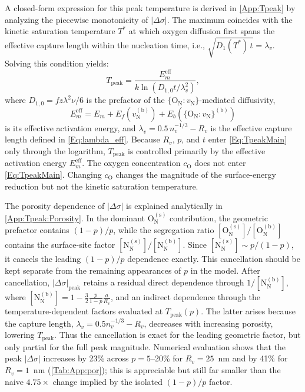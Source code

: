 \documentclass[preprint,12pt,sort&compress]{elsarticle}
\newcommand{\?}{\stackrel{?}{=}}
\begin{document}
A closed-form expression for this peak temperature is derived in \ref{App:Tpeak} by analyzing the piecewise monotonicity of $|\Delta\sigma|$. The maximum coincides with the kinetic saturation temperature $T^*$ at which oxygen diffusion first spans the effective capture length within the nucleation time, i.e., $\sqrt{D_1(T^*)\,t} = \lambda_v$. Solving this condition yields:
\begin{equation}
T_\text{peak} = \frac{ E_m^\mathrm{eff} }{ k\ln\!\left( D_{1,0}t/\lambda_v^2 \right) },
\label{Eq:TpeakMain}
\end{equation}
where $D_{1,0} = f z \lambda^2 \nu/6$ is the prefactor of the $\{\text{O}_\text{N} \! : \! v_\text{N}\}$-mediated diffusivity,
\begin{equation}
E_m^\mathrm{eff} = E_m + E_f(v_\text{N}^{(\text{b})}) + E_b(\{\text{O}_\text{N} \! : \! v_\text{N}\}^{(\text{b})})   
\end{equation}
is its effective activation energy, and $\lambda_v = 0.5\,n_v^{-1/3}-R_v$ is the effective capture length defined in \cref{Eq:lambda_eff}. Because $R_v$, $p$, and $t$ enter \cref{Eq:TpeakMain} only through the logarithm, $T_\text{peak}$ is controlled primarily by the effective activation energy $E_m^\mathrm{eff}$. The oxygen concentration $c_\text{O}$ does not enter \cref{Eq:TpeakMain}. Changing $c_\text{O}$ changes the magnitude of the surface-energy reduction but not the kinetic saturation temperature.

The porosity dependence of $|\Delta\sigma|$ is explained analytically in \ref{App:Tpeak:Porosity}. In the dominant $\text{O}_\text{N}^{(\text{s})}$ contribution, the geometric prefactor contains $(1-p)/p$, while the segregation ratio $[\text{O}_\text{N}^{(\text{s})}]/[\text{O}_\text{N}^{(\text{b})}]$ contains the surface-site factor $[\text{N}_\text{N}^{(\text{s})}]/[\text{N}_\text{N}^{(\text{b})}]$. Since $[\text{N}_\text{N}^{(\text{s})}] \sim p/(1-p)$, it cancels the leading $(1-p)/p$ dependence exactly. This cancellation should be kept separate from the remaining appearances of $p$ in the model. After cancellation, $|\Delta \sigma|_\text{peak}$ retains a residual direct dependence through $1/[\text{N}_\text{N}^{(\text{b})}]$, where $[\text{N}_\text{N}^{(\text{b})}]=1-\frac{3}{2}\frac{p}{1-p}\frac{a}{R_v}$, and an indirect dependence through the temperature-dependent factors evaluated at $T_\text{peak}(p)$. The latter arises because the capture length, $\lambda_v=0.5n_v^{-1/3}-R_v$, decreases with increasing porosity, lowering $T_\text{peak}$. Thus the cancellation is exact for the leading geometric factor, but only partial for the full peak magnitude. Numerical evaluation shows that the peak $|\Delta\sigma|$ increases by 23\% across $p=5$--20\% for $R_v=25$~nm and by 41\% for $R_v=1$~nm (\cref{Tab:App:por}); this is appreciable but still far smaller than the naive $4.75\times$ change implied by the isolated $(1-p)/p$ factor.
\end{document}
